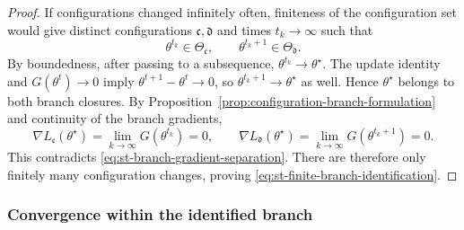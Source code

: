 \begin{proof}
If configurations changed infinitely often, finiteness of the
configuration set would give distinct configurations
$\mathfrak c,\mathfrak d$ and times $t_k\to\infty$ such that
\[
    \theta^{t_k}\in\Theta_{\mathfrak c},
    \qquad
    \theta^{t_k+1}\in\Theta_{\mathfrak d}.
\]
By boundedness, after passing to a subsequence,
$\theta^{t_k}\to\theta^\star$.
The update identity and $G(\theta^t)\to0$ imply
$\theta^{t+1}-\theta^t\to0$, so
$\theta^{t_k+1}\to\theta^\star$ as well.
Hence $\theta^\star$ belongs to both branch closures.
By Proposition~\ref{prop:configuration-branch-formulation}
and continuity of the branch gradients,
\[
    \nabla L_{\mathfrak c}(\theta^\star)
    =
    \lim_{k\to\infty}G(\theta^{t_k})=0,
    \qquad
    \nabla L_{\mathfrak d}(\theta^\star)
    =
    \lim_{k\to\infty}G(\theta^{t_k+1})=0.
\]
This contradicts \eqref{eq:st-branch-gradient-separation}.
There are therefore only finitely many configuration changes,
proving \eqref{eq:st-finite-branch-identification}.
\end{proof}

\subsubsection{Convergence within the identified branch}
\label{subsec:convergence-within-branch}

